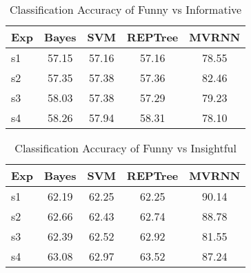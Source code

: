 \documentclass{acm_proc_article-sp}
\begin{document}
\begin{table}[t]
\caption{\label{}Classification Accuracy of Funny vs Informative }

\vspace{8pt} %

\centering
\begin{tabular}{|l |c |c| c| c|}
\hline%
Exp & Bayes & SVM & REPTree & MVRNN  \\
                 
\hline

s1 & 57.15 & 57.16 &57.16 & 78.55 \\
\hline
s2 & 57.35 & 57.38 &57.36 & 82.46 \\
\hline
s3 & 58.03 & 57.38 &57.29 & 79.23 \\
\hline
s4 & 58.26 & 57.94 &58.31 & 78.10 \\
\hline



\end{tabular}
\end{table}



\begin{table}[t]
\caption{\label{}Classification Accuracy of Funny vs Insightful }

\vspace{8pt} %

\centering
\begin{tabular}{|l |c |c| c| c|}
\hline%
Exp & Bayes & SVM & REPTree & MVRNN  \\
                 
\hline

s1 & 62.19 & 62.25 &62.25 & 90.14 \\
\hline
s2 & 62.66 & 62.43 &62.74 & 88.78 \\
\hline
s3 & 62.39 & 62.52 &62.92 & 81.55 \\
\hline
s4 & 63.08 & 62.97 &63.52 & 87.24 \\
\hline



\end{tabular}
\end{table}
\end{document}
